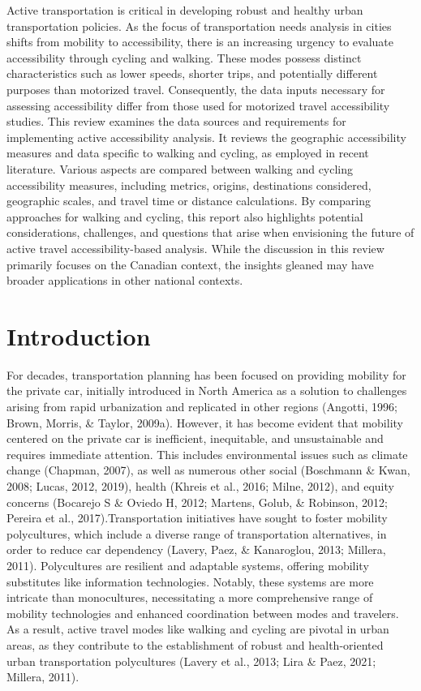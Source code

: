 \documentclass[
11pt, %
oneside, %
english, %
singlespacing, %
]{macthesis} %
\begin{document}
Active transportation is critical in developing robust and healthy urban transportation policies. As the focus of transportation needs analysis in cities shifts from mobility to accessibility, there is an increasing urgency to evaluate accessibility through cycling and walking. These modes possess distinct characteristics such as lower speeds, shorter trips, and potentially different purposes than motorized travel. Consequently, the data inputs necessary for assessing accessibility differ from those used for motorized travel accessibility studies. This review examines the data sources and requirements for implementing active accessibility analysis. It reviews the geographic accessibility measures and data specific to walking and cycling, as employed in recent literature. Various aspects are compared between walking and cycling accessibility measures, including metrics, origins, destinations considered, geographic scales, and travel time or distance calculations. By comparing approaches for walking and cycling, this report also highlights potential considerations, challenges, and questions that arise when envisioning the future of active travel accessibility-based analysis. While the discussion in this review primarily focuses on the Canadian context, the insights gleaned may have broader applications in other national contexts.

\section{Introduction}\label{introduction-1}

For decades, transportation planning has been focused on providing mobility for the private car, initially introduced in North America as a solution to challenges arising from rapid urbanization and replicated in other regions (Angotti, 1996; Brown, Morris, \& Taylor, 2009a). However, it has become evident that mobility centered on the private car is inefficient, inequitable, and unsustainable and requires immediate attention. This includes environmental issues such as climate change (Chapman, 2007), as well as numerous other social (Boschmann \& Kwan, 2008; Lucas, 2012, 2019), health (Khreis et al., 2016; Milne, 2012), and equity concerns (Bocarejo S \& Oviedo H, 2012; Martens, Golub, \& Robinson, 2012; Pereira et al., 2017).Transportation initiatives have sought to foster mobility polycultures, which include a diverse range of transportation alternatives, in order to reduce car dependency (Lavery, Paez, \& Kanaroglou, 2013; Millera, 2011). Polycultures are resilient and adaptable systems, offering mobility substitutes like information technologies. Notably, these systems are more intricate than monocultures, necessitating a more comprehensive range of mobility technologies and enhanced coordination between modes and travelers. As a result, active travel modes like walking and cycling are pivotal in urban areas, as they contribute to the establishment of robust and health-oriented urban transportation polycultures (Lavery et al., 2013; Lira \& Paez, 2021; Millera, 2011).
\end{document}
